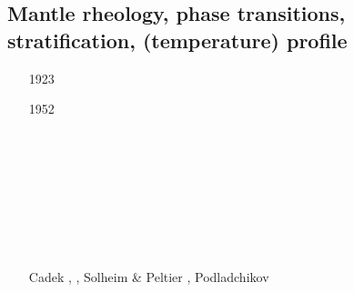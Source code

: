 \subsection{Mantle rheology, phase transitions, stratification, (temperature) profile}

\begin{scriptsize}
\begin{itemize}
\item[1923] 
\textcite{wiad23} 
\item[1952] 
\textcite{birc52} 
\item[\nineteenseventysix] 
\textcite{ocon76} 
\item[\nineteenseventyseven] 
\cite{stac77}
\item[\nineteeneightytwo] 
\cite{yusb82}
\cite{chri82}
\item[\nineteeneightyfive] 
\cite{chyu85}
\item[\nineteeneightysix] 
\cite{yuen86} 
\item[\nineteeneightynine] 
\cite{itka89} 
\item[\nineteenninetyone] 
\cite{fopd91} 
\item[\nineteenninetytwo] 
\cite{zhyh92} 
\cite{zhyh92}
\item[\nineteenninetythree] 
\cite{tasg93} \cite{tasg93}\\  
\cite{best93} \cite{best93}\\
\cite{kief93} \cite{kief93}\\
\cite{styz93} \cite{styz93}\\
\cite{yucc93} \cite{yucc93}\\
\cite{hoby93} \cite{hoby93}\\
\cite{dayu93} \cite{dayu93}\\
\item[\nineteenninetyfour] Cadek \etal \cite{cays94}, \cite{vayv94}
                    \cite{zhgu94b}\cite{styu94}, Solheim \& Peltier \cite{sope94},
                    Podladchikov \etal \cite{popy94}

\end{itemize}
\end{scriptsize}
